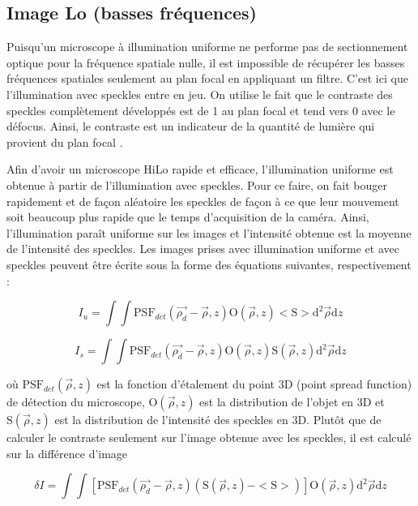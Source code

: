 \documentclass{article}       %
\begin{document}
\subsection{Image Lo (basses fréquences)}
\label{ImagesLo}

Puisqu'un microscope à illumination uniforme ne performe pas de sectionnement optique pour la fréquence spatiale nulle, il est impossible de récupérer les basses fréquences spatiales seulement au plan focal en appliquant un filtre. C'est ici que l'illumination avec speckles entre en jeu. On utilise le fait que le contraste des speckles complètement développés est de 1 au plan focal et tend vers 0 avec le défocus. Ainsi, le contraste est un indicateur de la quantité de lumière qui provient du plan focal \cite{Mertz2008}.

Afin d'avoir un microscope HiLo rapide et efficace, l'illumination uniforme est obtenue à partir de l'illumination avec speckles. Pour ce faire, on fait bouger rapidement et de façon aléatoire les speckles de façon à ce que leur mouvement soit beaucoup plus rapide que le temps d'acquisition de la caméra. Ainsi, l'illumination paraît uniforme sur les images et l'intensité obtenue est la moyenne de l'intensité des speckles. Les images prises avec illumination uniforme et avec speckles peuvent être écrite sous la forme des équations suivantes, respectivement \cite{Mertz2011}:

\begin{equation*}
    I_{u} = \int \int \text{PSF}_{det}(\vec{\rho_{d}} - \vec{\rho}, z)\text{O}(\vec{\rho}, z)<\text{S}>\text{d}^{2}\vec{\rho}\text{d}z
\end{equation*}

\begin{equation*}
    I_{s} = \int \int \text{PSF}_{det}(\vec{\rho_{d}} - \vec{\rho}, z)\text{O}(\vec{\rho}, z)\text{S}(\vec{\rho}, z)\text{d}^{2}\vec{\rho}\text{d}z
\end{equation*}

où $\text{PSF}_{det}(\vec{\rho}, z)$ est la fonction d'étalement du point 3D (point spread function) de détection du microscope, $\text{O}(\vec{\rho}, z)$ est la distribution de l'objet en 3D et $\text{S}(\vec{\rho}, z)$ est la distribution de l'intensité des speckles en 3D. Plutôt que de calculer le contraste seulement sur l'image obtenue avec les speckles, il est calculé sur la différence d'image \cite{Mertz2011}

\begin{equation*}
        \delta I = \int \int \left[\text{PSF}_{det}(\vec{\rho_{d}} - \vec{\rho}, z)\left(\text{S}(\vec{\rho}, z) - <\text{S}>\right) \right]\text{O}(\vec{\rho}, z)\text{d}^{2}\vec{\rho}\text{d}z
\end{equation*}
\end{document}
